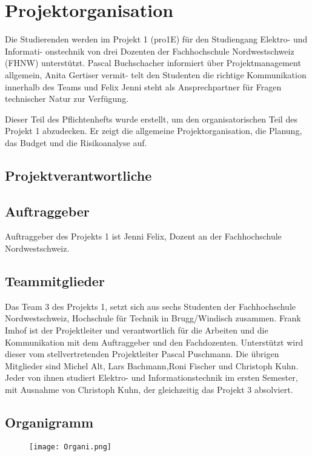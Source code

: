 \section{Projektorganisation}

Die Studierenden werden im Projekt 1 (pro1E) für den Studiengang Elektro- und Informati- onstechnik von drei Dozenten der Fachhochschule Nordwestschweiz (FHNW) unterstützt. Pascal Buchschacher informiert über Projektmanagement allgemein, Anita Gertiser vermit- telt den Studenten die richtige Kommunikation innerhalb des Teams und Felix Jenni steht als Ansprechpartner für Fragen technischer Natur zur Verfügung.

Dieser Teil des Pflichtenhefts wurde erstellt, um den organisatorischen Teil des Projekt 1 abzudecken. Er zeigt die allgemeine Projektorganisation, die Planung, das Budget und die Risikoanalyse auf.
\subsection{Projektverantwortliche}

\subsection{Auftraggeber}
Auftraggeber des Projekts 1 ist Jenni Felix, Dozent an der Fachhochschule Nordwestschweiz.

\subsection{Teammitglieder}
Das Team 3 des Projekts 1, setzt sich aus sechs Studenten der Fachhochschule Nordwestschweiz, Hochschule für Technik in Brugg/Windisch zusammen. Frank Imhof ist der Projektleiter und verantwortlich für die Arbeiten und die Kommunikation mit dem Auftraggeber und den Fachdozenten. Unterstützt wird dieser vom stellvertretenden Projektleiter Pascal Puschmann. Die übrigen Mitglieder sind Michel Alt, Lars Bachmann,Roni Fischer und Christoph Kuhn. Jeder von ihnen studiert Elektro- und Informationstechnik im ersten Semester, mit Ausnahme von Christoph Kuhn, der gleichzeitig das Projekt 3 absolviert.

\subsection{Organigramm}
\begin{figure}[H]
	\centering
	\texttt{[image: Organi.png]}
	\label{fig:Organigramm}
\end{figure}

